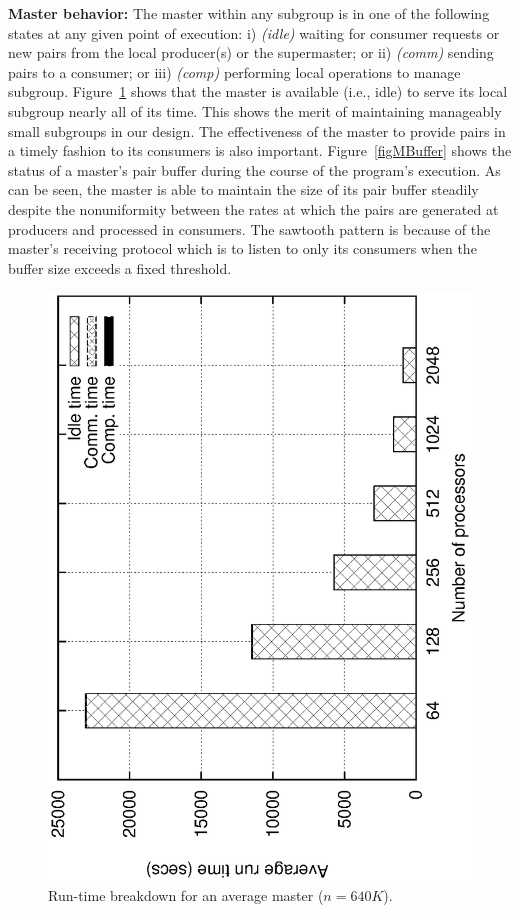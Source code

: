 \documentclass[10pt,journal,letterpaper,compsoc]{IEEEtran}
\begin{document}
{\bf Master behavior:} The master within any subgroup is in one of the following states at any given point of execution: i) \emph{(idle)} waiting for consumer requests or new pairs from the local producer(s) or the supermaster; or ii) \emph{(comm)} sending pairs to a consumer; or iii) \emph{(comp)} performing local operations to manage subgroup. Figure~\ref{figMasterBreakdown} shows that the master is available (i.e., idle) to serve its local subgroup nearly all of its time. This shows the merit of maintaining manageably small subgroups in our design. 
The effectiveness of the master to provide pairs in a timely fashion to its consumers is also important. Figure~\ref{figMBuffer} shows the status of a master's pair buffer during the course of the program's execution. As can be seen, the master is able to maintain the size of its pair buffer steadily despite the nonuniformity between the rates at which the pairs are generated at producers and processed in consumers. The sawtooth pattern is because of the master's receiving protocol which is to listen to only its consumers when the buffer size exceeds a fixed threshold. 


\begin{figure}[tb]
\centerline{
						\includegraphics[angle=-90, scale=0.5]{msBreak.eps}
            }
\caption{
Run-time breakdown for an average master ($n=640K$).
}
\label{figMasterBreakdown}
\end{figure}
\end{document}
